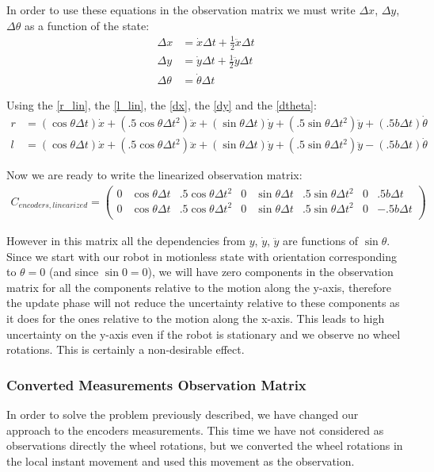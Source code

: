 In order to use these equations in the observation matrix we must write $\Delta x$, $\Delta y$, $\Delta \theta$ as a function of the state:
\begin{align}
	\Delta x &= \dot{x} \Delta t + \frac{1}{2} \ddot{x} \Delta t\label{dx}\\
	\Delta y &= \dot{y} \Delta t + \frac{1}{2} \ddot{y} \Delta t\label{dy}\\
	\Delta \theta &= \dot{\theta} \Delta t\label{dtheta}
\end{align}

Using the \ref{r_lin}, the \ref{l_lin}, the \ref{dx}, the \ref{dy} and the \ref{dtheta}:
\begin{align}
	r &= (\cos\theta \Delta t)\dot{x} + (.5 \cos\theta \Delta t^2)\ddot{x} + (\sin\theta \Delta t)\dot{y} + (.5 \sin\theta \Delta t^2)\ddot{y} + (.5 b \Delta t)\dot{\theta}\\
	l &= (\cos\theta \Delta t)\dot{x} + (.5 \cos\theta \Delta t^2)\ddot{x} + (\sin\theta \Delta t)\dot{y} + (.5 \sin\theta \Delta t^2)\ddot{y} - (.5 b \Delta t)\dot{\theta}
\end{align}

Now we are ready to write the linearized observation matrix:
\begin{align}
	C_{encoders,linearized} = \begin{pmatrix}
				0 & \cos\theta \Delta t & .5 \cos\theta \Delta t^2 & 0 & \sin\theta \Delta t & .5 \sin\theta \Delta t^2 & 0 & .5 b \Delta t\\
				0 & \cos\theta \Delta t & .5 \cos\theta \Delta t^2 & 0 & \sin\theta \Delta t & .5 \sin\theta \Delta t^2 & 0 & -.5 b \Delta t\\
			\end{pmatrix}
\end{align}

However in this matrix all the dependencies from $y$, $\dot{y}$, $\ddot{y}$ are functions of $\sin\theta$. Since we start with our robot in motionless state with orientation corresponding to $\theta = 0$ (and since $\sin 0 = 0$), we will have zero components in the observation matrix for all the components relative to the motion along the y-axis, therefore the update phase will not reduce the uncertainty relative to these components as it does for the ones relative to the motion along the x-axis. This leads to high uncertainty on the y-axis even if the robot is stationary and we observe no wheel rotations. This is certainly a non-desirable effect.

\subsubsection{Converted Measurements Observation Matrix}
In order to solve the problem previously described, we have changed our approach to the encoders measurements. This time we have not considered as observations directly the wheel rotations, but we converted the wheel rotations in the local instant movement and used this movement as the observation.\\

